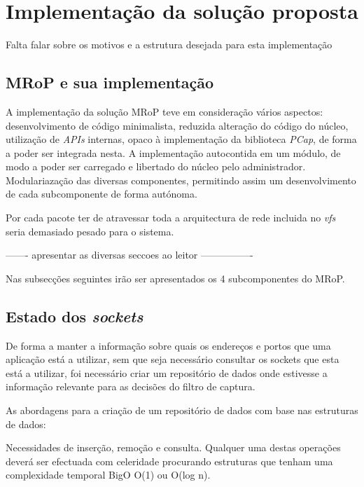 \chapter{Implementação da solução proposta}
\label{cap:Implementacao}

Falta falar sobre os motivos e a estrutura desejada para esta implementação

\section{MRoP e sua implementação}
\label{sec:mrop_implementation}

A implementação da solução MRoP teve em consideração vários aspectos: desenvolvimento de código minimalista, reduzida alteração do código do núcleo, utilização de \textit{APIs} internas, opaco à implementação da biblioteca \textit{PCap}, de forma a poder ser integrada nesta.
A implementação autocontida em um módulo, de modo a poder ser carregado e libertado do núcleo pelo administrador.
Modulariazação das diversas componentes, permitindo assim um desenvolvimento de cada subcomponente de forma autónoma.

Por cada pacote ter de atravessar toda a arquitectura de rede incluida no \textit{vfs} seria demasiado pesado para o sistema.

------- apresentar as diversas seccoes ao leitor ----------------

Nas subsecções seguintes irão ser apresentados os 4 subcomponentes do MRoP.


\section{Estado dos \textit{sockets}}

De forma a manter a informação sobre quais os endereços e portos que uma aplicação está a utilizar, sem que seja necessário consultar os sockets que esta está a utilizar, foi necessário criar um repositório de dados onde estivesse a informação relevante para as decisões do filtro de captura.

As abordagens para a criação de um repositório de dados com base nas estruturas de dados:

Necessidades de inserção, remoção e consulta. Qualquer uma destas operações deverá ser efectuada com celeridade procurando estruturas que tenham uma complexidade temporal BigO O(1) ou O(log n).

